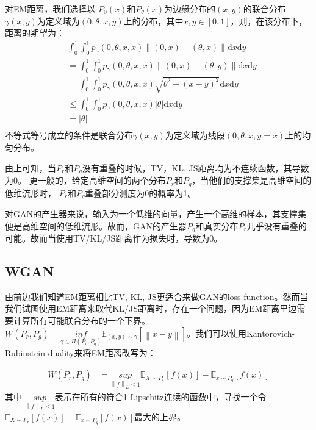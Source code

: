 对EM距离，我们选择以 ${P}_0(x)$和${P}_\theta(x)$为边缘分布的$(x,y)$的联合分布$\gamma(x,y)$为定义域为$(0, \theta, x, y)$上的分布，其中$x,y \in [0,1]$，则，在该分布下，距离的期望为：
\begin{displaymath}
\begin{split}
&\int_0^1 \int_0^1 p_{\gamma}(0,\theta,x, x) \left \| (0,x) - (\theta, x) \right \| \mathrm{d} x  \mathrm{d} y \\
&= \int_0^1 \int_0^1 p_{\gamma}(0,\theta,x, x)  \left \| (0,x) - (\theta, y) \right \| \mathrm{d} x   \mathrm{d} y\\
&= \int_0^1 \int_0^1 p_{\gamma}(0,\theta,x, x)  \sqrt {\theta ^ 2 + (x-y)^2}\mathrm{d} x \mathrm{d} y\\
& \leq \int_0^1 \int_0^1 p_{\gamma}(0,\theta,x, x) |\theta| \mathrm{d} x \mathrm{d} y\\
&= |\theta|\\
\end{split}
\end{displaymath}
不等式等号成立的条件是联合分布$\gamma(x,y)$为定义域为线段$(0, \theta, x, y=x)$上的均匀分布。

由上可知，当${P}_r$和${P}_g$没有重叠的时候，TV，KL, JS距离均为不连续函数，其导数为0。
更一般的，给定高维空间的两个分布${P}_r$和${P}_g$，当他们的支撑集是高维空间的低维流形时， ${P}_r$和${P}_g$重叠部分测度为0的概率为1。

对GAN的产生器来说，输入为一个低维的向量，产生一个高维的样本，其支撑集便是高维空间的低维流形。故而，GAN的产生器${P}_g$和真实分布${P}_r$几乎没有重叠的可能。故而当使用TV/KL/JS距离作为损失时，导数为0。

\subsection{WGAN}

由前边我们知道EM距离相比TV, KL, JS更适合来做GAN的loss function。然而当我们试图使用EM距离来取代KL/JS距离时，存在一个问题，因为EM距离里边需要计算所有可能联合分布的一个下界。$W({P}_r,{P}_g) = \underset{\gamma \in \Pi({P}_r, {P}_g)}{inf} \mathbb{E}_{(x,y) \sim \gamma} [\left \| x-y \right \|]$。我们可以使用Kantorovich-Rubinstein duality来将EM距离改写为：

\begin{displaymath}
\begin{split}
W({P}_r, {P}_g) & = \underset{\left \| f \right \|_{L} \leq 1}{sup} \mathbb{E} _{X \sim {P}_r}[f(x)] - \mathbb{E}_{x \sim {P}_g}[f(x)]
\end{split}
\end{displaymath}
其中 $ \underset{\left \| f \right \|_{L} \leq 1}{sup} $表示在所有的符合1-Lipschitz连续的函数中，寻找一个令$\mathbb{E} _{X \sim {P}_r}[f(x)] - \mathbb{E}_{x \sim {P}_g}[f(x)]$最大的上界。

